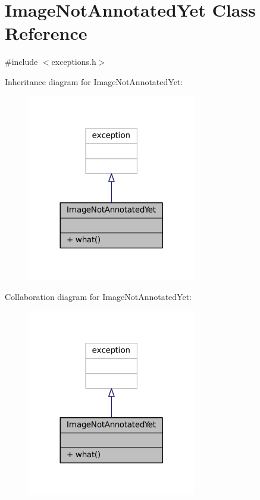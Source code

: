 \hypertarget{classImageNotAnnotatedYet}{}\section{Image\+Not\+Annotated\+Yet Class Reference}
\label{classImageNotAnnotatedYet}


{\ttfamily \#include $<$exceptions.\+h$>$}



Inheritance diagram for Image\+Not\+Annotated\+Yet\+:\nopagebreak
\begin{figure}[H]
\begin{center}
\leavevmode
\includegraphics[width=209pt]{classImageNotAnnotatedYet__inherit__graph}
\end{center}
\end{figure}


Collaboration diagram for Image\+Not\+Annotated\+Yet\+:\nopagebreak
\begin{figure}[H]
\begin{center}
\leavevmode
\includegraphics[width=209pt]{classImageNotAnnotatedYet__coll__graph}
\end{center}
\end{figure}
